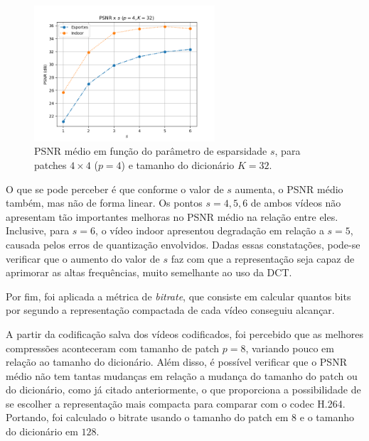 \documentclass[cic,tc]{iiufrgs}
\begin{document}
\begin{figure}[H]
    \caption{PSNR médio em função do parâmetro de esparsidade $s$, para patches $4\times4$ ($p=4$) e 
    tamanho do dicionário $K=32$.}
    \begin{center}
        \includegraphics[width=0.6\textwidth]{img/graficos/p4d32_sv_psnr.png}
    \end{center}
    \label{fig:psnrsvar}
\end{figure}

O que se pode perceber é que conforme o valor de $s$ aumenta, o PSNR médio também, 
mas não de forma linear.
Os pontos $s=4,5,6$ de ambos vídeos não apresentam tão importantes melhoras no 
PSNR médio na relação entre eles. 
Inclusive, para $s=6$, o vídeo indoor apresentou degradação em relação a $s=5$, 
causada pelos erros de quantização envolvidos.
Dadas essas constatações, pode-se verificar que o aumento do valor de $s$ faz com 
que a representação seja capaz de aprimorar as altas frequências, muito semelhante 
ao uso da DCT.

Por fim, foi aplicada a métrica de \emph{bitrate},
que consiste em calcular quantos bits por segundo a representação compactada 
de cada vídeo conseguiu alcançar.

A partir da codificação salva dos vídeos codificados,
foi percebido que as melhores compressões aconteceram com tamanho de patch $p=8$, 
variando pouco em relação ao tamanho do dicionário.
Além disso, é possível verificar que o PSNR médio não tem tantas mudanças em relação 
a mudança do tamanho do patch ou do dicionário, como já citado anteriormente,
o que proporciona a possibilidade de se escolher a representação mais compacta para 
comparar com o codec H.264.
Portando, foi calculado o bitrate usando o tamanho do patch em $8$ e o tamanho do dicionário
em $128$.
\end{document}
